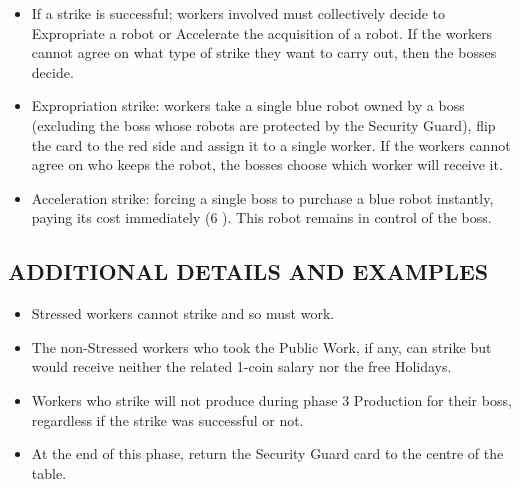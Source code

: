 \begin{itemize}
            take the robot card and put it in a robots' rubbish pile (any place on the table,
            just make clear that this robot is not assigned to any player). The destroyed
            robots won't produce coins for anyone, but will count towards the workers'
            collective victory condition together with the expropriated robots. Also, destroying
            robots helps the Luddite to achieve an individual victory: If 3 robots
            get destroyed (over 3 failed strikes), see Luddite's victory conditions.
            \item If a strike is successful; workers involved must collectively decide to Expropriate
            a robot or Accelerate the acquisition of a robot. If the workers cannot
            agree on what type of strike they want to carry out, then the bosses decide.
            \item Expropriation strike: workers take a single blue robot owned by a boss
            (excluding the boss whose robots are protected by the Security Guard), flip
            the card to the red side and assign it to a single worker. If the workers
            cannot agree on who keeps the robot, the bosses choose which worker will
            receive it.
            \item Acceleration strike: forcing a single boss to purchase a blue robot instantly,
            paying its cost immediately (6 \faRubleSign). This robot remains in control of the boss.
        \end{itemize}
    
    \subsection{ADDITIONAL DETAILS AND EXAMPLES}

        \begin{itemize}
            \item Stressed workers cannot strike and so must work.
            \item The non-Stressed workers who took the Public Work, if any, can strike but
            would receive neither the related 1-coin salary nor the free Holidays.
            \item Workers who strike will not produce during phase 3 Production for their
            boss, regardless if the strike was successful or not.
            \item At the end of this phase, return the Security Guard card to the centre of the
            table.
        \end{itemize}

